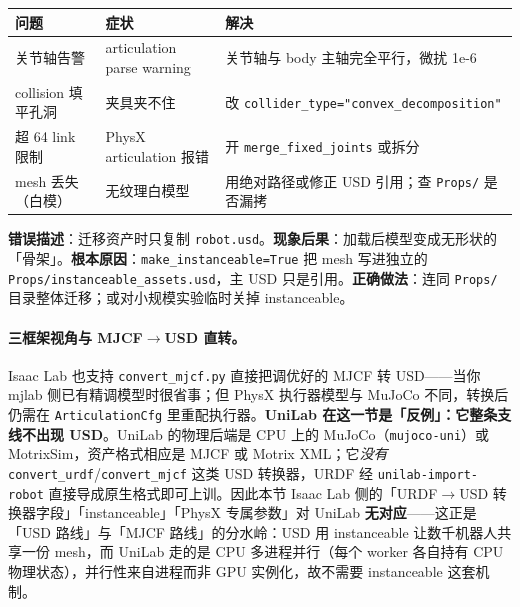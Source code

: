 \begin{center}
\small
\begin{tabular}{@{}llp{4.4cm}@{}}
\toprule
问题 & 症状 & 解决 \\
\midrule
关节轴告警 & articulation parse warning & 关节轴与 body 主轴完全平行，微扰 1e-6 \\
collision 填平孔洞 & 夹具夹不住 & 改 \texttt{collider\_type="convex\_decomposition"} \\
超 64 link 限制 & PhysX articulation 报错 & 开 \texttt{merge\_fixed\_joints} 或拆分 \\
mesh 丢失（白模） & 无纹理白模型 & 用绝对路径或修正 USD 引用；查 \texttt{Props/} 是否漏拷 \\
\bottomrule
\end{tabular}
\end{center}

\begin{pitfall}
\textbf{错误描述}：迁移资产时只复制 \texttt{robot.usd}。\textbf{现象后果}：加载后模型变成无形状的「骨架」。\textbf{根本原因}：\texttt{make\_instanceable=True} 把 mesh 写进独立的 \texttt{Props/\allowbreak instanceable\_assets.\allowbreak usd}，主 USD 只是引用。\textbf{正确做法}：连同 \texttt{Props/} 目录整体迁移；或对小规模实验临时关掉 instanceable。
\end{pitfall}

\paragraph{三框架视角与 \texorpdfstring{MJCF$\to$USD}{MJCF-USD} 直转。}Isaac Lab 也支持 \texttt{convert\_mjcf.\allowbreak py} 直接把调优好的 MJCF 转 USD——当你 mjlab 侧已有精调模型时很省事；但 PhysX 执行器模型与 MuJoCo 不同，转换后仍需在 \texttt{ArticulationCfg} 里重配执行器。\textbf{UniLab 在这一节是「反例」：它整条支线不出现 USD}。UniLab 的物理后端是 CPU 上的 MuJoCo（\texttt{mujoco-uni}）或 MotrixSim，资产格式相应是 MJCF 或 Motrix XML；它\emph{没有} \texttt{convert\_urdf}/\allowbreak\texttt{convert\_mjcf} 这类 USD 转换器，URDF 经 \texttt{unilab-import-robot} 直接导成原生格式即可上训。因此本节 Isaac Lab 侧的「URDF$\to$USD 转换器字段」「instanceable」「PhysX 专属参数」对 UniLab \textbf{无对应}——这正是「USD 路线」与「MJCF 路线」的分水岭：USD 用 instanceable 让数千机器人共享一份 mesh，而 UniLab 走的是 CPU 多进程并行（每个 worker 各自持有 CPU 物理状态），并行性来自进程而非 GPU 实例化，故不需要 instanceable 这套机制。


